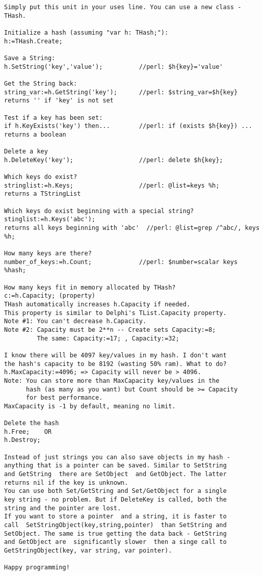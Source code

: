 \documentclass{report}
\begin{document}
\begin{verbatim}
Simply put this unit in your uses line. You can use a new class - THash.

Initialize a hash (assuming "var h: THash;"):
h:=THash.Create;

Save a String:
h.SetString('key','value');          //perl: $h{key}='value'

Get the String back:
string_var:=h.GetString('key');      //perl: $string_var=$h{key}
returns '' if 'key' is not set

Test if a key has been set:
if h.KeyExists('key') then...        //perl: if (exists $h{key}) ...
returns a boolean

Delete a key
h.DeleteKey('key');                  //perl: delete $h{key};

Which keys do exist?
stringlist:=h.Keys;                  //perl: @list=keys %h;
returns a TStringList

Which keys do exist beginning with a special string?
stinglist:=h.Keys('abc');
returns all keys beginning with 'abc'  //perl: @list=grep /^abc/, keys %h;

How many keys are there?
number_of_keys:=h.Count;             //perl: $number=scalar keys %hash;

How many keys fit in memory allocated by THash?
c:=h.Capacity; (property)
THash automatically increases h.Capacity if needed.
This property is similar to Delphi's TList.Capacity property.
Note #1: You can't decrease h.Capacity.
Note #2: Capacity must be 2**n -- Create sets Capacity:=8;
         The same: Capacity:=17; , Capacity:=32;

I know there will be 4097 key/values in my hash. I don't want
the hash's capacity to be 8192 (wasting 50% ram). What to do?
h.MaxCapacity:=4096; => Capacity will never be > 4096.
Note: You can store more than MaxCapacity key/values in the
      hash (as many as you want) but Count should be >= Capacity
      for best performance.
MaxCapacity is -1 by default, meaning no limit.

Delete the hash
h.Free;    OR
h.Destroy;

Instead of just strings you can also save objects in my hash -
anything that is a pointer can be saved. Similar to SetString
and GetString  there are SetObject  and GetObject. The latter
returns nil if the key is unknown.
You can use both Set/GetString and Set/GetObject for a single
key string - no problem. But if DeleteKey is called, both the
string and the pointer are lost.
If you want to store a pointer  and a string, it is faster to
call  SetStringObject(key,string,pointer)  than SetString and
SetObject. The same is true getting the data back - GetString
and GetObject are  significantly slower  then a singe call to
GetStringObject(key, var string, var pointer).

Happy programming!\end{verbatim}
\end{document}
